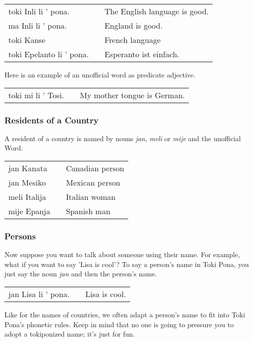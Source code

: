 \begin{supertabular}{p{5,5cm}|ll}
toki Inli li ' pona. && The English language is good. \\
ma Inli li ' pona. && England is good. \\
toki Kanse && French language \\
toki Epelanto li ' pona. && Esperanto ist einfach. \\
\end{supertabular} 

Here is an example of an unofficial word as predicate adjective.

\begin{supertabular}{p{5,5cm}|ll}
toki mi li ' Tosi. && My mother tongue is German. \\
\end{supertabular}

%
\subsubsection*{Residents of a Country}
%
A resident of a country is named by nouns \textit{jan}, \textit{meli} or \textit{mije} and the unofficial Word.

\begin{supertabular}{p{5,5cm}|ll}
jan Kanata && Canadian person \\
jan Mesiko && Mexican person \\
meli Italija && Italian woman \\
mije Epanja && Spanish man \\
\end{supertabular} 

%
\subsubsection*{Persons}
%
Now suppose you want to talk about someone using their name. 
For example, what if you want to say 'Lisa is cool'? 
To say a person's name in Toki Pona, you just say the noun \textit{jan} and then the person's name. 

\begin{supertabular}{p{5,5cm}|ll}
jan Lisa li ' pona. && Lisa is cool. \\
\end{supertabular} 

Like for the names of countries, we often adapt a person's name to fit into Toki Pona's phonetic rules. 
Keep in mind that no one is going to pressure you to adopt a tokiponized name; it's just for fun. 


